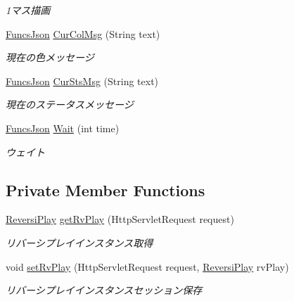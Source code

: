 \begin{DoxyCompactItemize}
\begin{DoxyCompactList}\small\item\em 1マス描画 \end{DoxyCompactList}\item 
\hyperlink{classjp_1_1gr_1_1java__conf_1_1yuta__yoshinaga_1_1reversi_1_1model_1_1_funcs_json}{Funcs\+Json} \hyperlink{classjp_1_1gr_1_1java__conf_1_1yuta__yoshinaga_1_1reversi_1_1controller_1_1_reversi_controller_aa4c4d8fe61727c848170cff7120e82db}{Cur\+Col\+Msg} (String text)
\begin{DoxyCompactList}\small\item\em 現在の色メッセージ \end{DoxyCompactList}\item 
\hyperlink{classjp_1_1gr_1_1java__conf_1_1yuta__yoshinaga_1_1reversi_1_1model_1_1_funcs_json}{Funcs\+Json} \hyperlink{classjp_1_1gr_1_1java__conf_1_1yuta__yoshinaga_1_1reversi_1_1controller_1_1_reversi_controller_a54cfbfa89d25bb2db441473ba53a5140}{Cur\+Sts\+Msg} (String text)
\begin{DoxyCompactList}\small\item\em 現在のステータスメッセージ \end{DoxyCompactList}\item 
\hyperlink{classjp_1_1gr_1_1java__conf_1_1yuta__yoshinaga_1_1reversi_1_1model_1_1_funcs_json}{Funcs\+Json} \hyperlink{classjp_1_1gr_1_1java__conf_1_1yuta__yoshinaga_1_1reversi_1_1controller_1_1_reversi_controller_a4f290c6bccc40ff5239ef8047bb644d8}{Wait} (int time)
\begin{DoxyCompactList}\small\item\em ウェイト \end{DoxyCompactList}\end{DoxyCompactItemize}
\subsection*{Private Member Functions}
\begin{DoxyCompactItemize}
\item 
\hyperlink{classjp_1_1gr_1_1java__conf_1_1yuta__yoshinaga_1_1reversi_1_1model_1_1_reversi_play}{Reversi\+Play} \hyperlink{classjp_1_1gr_1_1java__conf_1_1yuta__yoshinaga_1_1reversi_1_1controller_1_1_reversi_controller_ae0b09a6cc58c14296aaed1cf50ab1087}{get\+Rv\+Play} (Http\+Servlet\+Request request)
\begin{DoxyCompactList}\small\item\em リバーシプレイインスタンス取得 \end{DoxyCompactList}\item 
void \hyperlink{classjp_1_1gr_1_1java__conf_1_1yuta__yoshinaga_1_1reversi_1_1controller_1_1_reversi_controller_a1d06864481177386fe8d2b01216790f4}{set\+Rv\+Play} (Http\+Servlet\+Request request, \hyperlink{classjp_1_1gr_1_1java__conf_1_1yuta__yoshinaga_1_1reversi_1_1model_1_1_reversi_play}{Reversi\+Play} rv\+Play)
\begin{DoxyCompactList}\small\item\em リバーシプレイインスタンスセッション保存 \end{DoxyCompactList}\end{DoxyCompactItemize}


